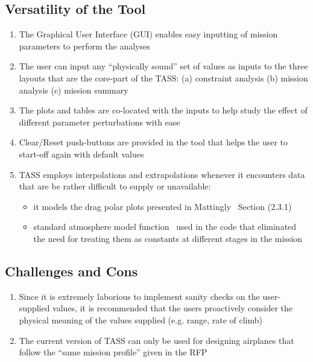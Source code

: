 \documentclass[pdftex,11pt,letter]{article}
\begin{document}
\subsection{Versatility of the Tool}

\begin{enumerate}

\item The Graphical User Interface (GUI) enables easy inputting of mission parameters to perform the analyses


\item The user can input any ``physically sound'' set of values as inputs to the three layouts that are the core-part of the TASS: (a) constraint analysis (b) mission analysis (c) mission summary

\item The plots and tables are co-located with the inputs to help study the effect of different parameter perturbations with ease


\item Clear/Reset push-buttons are provided in the tool that helps the user to start-off again with default values

\item TASS employs interpolations and extrapolations whenever it encounters data that are be rather difficult to supply or unavailable:

\begin{itemize}
\item it models the drag polar plots presented in Mattingly~\cite{MattinglyText} Section (2.3.1)
\item standard atmosphere model function~\cite{sky} used in the code that eliminated the need for treating them as constants at different stages in the mission
\end{itemize}

\end{enumerate}

\subsection{Challenges and Cons}

\begin{enumerate}

\item  Since it is extremely laborious to implement sanity checks on the user-supplied values, it is recommended that the users proactively consider the physical meaning of the values supplied (e.g. range, rate of climb)

\item The current version of TASS can only be used for designing airplanes that follow the ``same mission profile'' given in the RFP

\end{enumerate}
\end{document}
